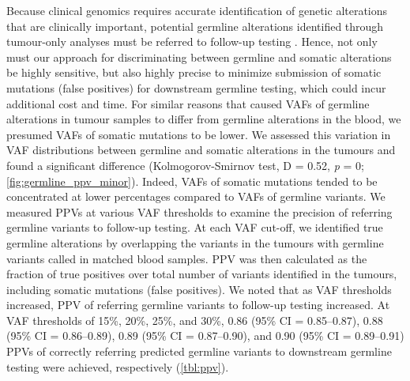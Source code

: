 Because clinical genomics requires accurate identification of genetic alterations that are clinically important, potential germline alterations identified through tumour-only analyses must be referred to follow-up testing \cite{Raymond2016, Bombard2014, Green2013}. Hence, not only must our approach for discriminating between germline and somatic alterations be highly sensitive, but also highly precise to minimize submission of somatic mutations (false positives) for downstream germline testing, which could incur additional cost and time. For similar reasons that caused VAFs of germline alterations in tumour samples to differ from germline alterations in the blood, we presumed VAFs of somatic mutations to be lower. We assessed this variation in VAF distributions between germline and somatic alterations in the tumours and found a significant difference (Kolmogorov-Smirnov test, D = 0.52, \textit{p} = 0; \autoref{fig:germline_ppv_minor}). Indeed, VAFs of somatic mutations tended to be concentrated at lower percentages compared to VAFs of germline variants. We measured PPVs at various VAF thresholds to examine the precision of referring germline variants to follow-up testing. At each VAF cut-off, we identified true germline alterations by overlapping the variants in the tumours with germline variants called in matched blood samples. PPV was then calculated as the fraction of true positives over total number of variants identified in the tumours, including somatic mutations (false positives). We noted that as VAF thresholds increased, PPV of referring germline variants to follow-up testing increased. At VAF thresholds of 15\%, 20\%, 25\%, and 30\%, 0.86 (95\% CI = 0.85--0.87), 0.88 (95\% CI = 0.86--0.89), 0.89 (95\% CI = 0.87--0.90), and 0.90 (95\% CI = 0.89--0.91) PPVs of correctly referring predicted germline variants to downstream germline testing were achieved, respectively (\autoref{tbl:ppv}).

